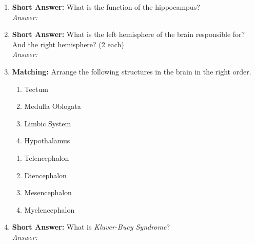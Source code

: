 \begin{enumerate}[label=\textbf{Q1.10.\arabic*}]
      \item \textbf{Short Answer:} What is the function of the hippocampus? \\
            \textit{Answer:} %

      \item \textbf{Short Answer:} What is the left hemisphere of the brain responsible for? And the right hemisphere? (2 each) \\
            \textit{Answer:} \\%

      \item \textbf{Matching:} Arrange the following structures in the brain in the right order.
      \begin{wordbox}
            \begin{enumerate}[label=(\roman*)]
                  \item Tectum
                  \item Medulla Oblogata
                  \item Limbic System
                  \item Hypothalamus
            \end{enumerate}
      \end{wordbox}
      \begin{enumerate}[label=(\alph*)]
            \item Telencephalon \quad \dotfill \quad \underline{\hspace{3cm}}\\[0.5em]
            \item Diencephalon \quad \dotfill \quad \underline{\hspace{3cm}}\\[0.5em]
            \item Mesencephalon \quad \dotfill \quad \underline{\hspace{3cm}}\\[0.5em]
            \item Myelencephalon \quad \dotfill \quad \underline{\hspace{3cm}}
      \end{enumerate}

      \item \textbf{Short Answer:} What is \textit{Kluver-Bucy Syndrome}? \\
            \textit{Answer:} %


\end{enumerate}
